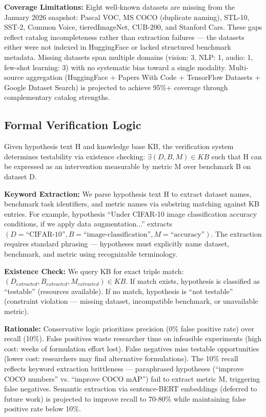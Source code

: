 \textbf{Coverage Limitations:} Eight well-known datasets are missing from the January 2026 snapshot: Pascal VOC, MS COCO (duplicate naming), STL-10, SST-2, Common Voice, tieredImageNet, CUB-200, and Stanford Cars. These gaps reflect catalog incompleteness rather than extraction failures --- the datasets either were not indexed in HuggingFace or lacked structured benchmark metadata. Missing datasets span multiple domains (vision: 3, NLP: 1, audio: 1, few-shot learning: 3) with no systematic bias toward a single modality. Multi-source aggregation (HuggingFace + Papers With Code + TensorFlow Datasets + Google Dataset Search) is projected to achieve 95\%+ coverage through complementary catalog strengths.

\subsection{Formal Verification Logic}

Given hypothesis text H and knowledge base KB, the verification system determines testability via existence checking: $\exists (D,B,M) \in KB$ such that H can be expressed as an intervention measurable by metric M over benchmark B on dataset D.

\textbf{Keyword Extraction:} We parse hypothesis text H to extract dataset names, benchmark task identifiers, and metric names via substring matching against KB entries. For example, hypothesis ``Under CIFAR-10 image classification accuracy conditions, if we apply data augmentation...'' extracts $(D=\text{``CIFAR-10''}, B=\text{``image-classification''}, M=\text{``accuracy''})$. The extraction requires standard phrasing --- hypotheses must explicitly name dataset, benchmark, and metric using recognizable terminology.

\textbf{Existence Check:} We query KB for exact triple match: $(D_{extracted}, B_{extracted}, M_{extracted}) \in KB$. If match exists, hypothesis is classified as ``testable'' (resources available). If no match, hypothesis is ``not testable'' (constraint violation --- missing dataset, incompatible benchmark, or unavailable metric).

\textbf{Rationale:} Conservative logic prioritizes precision (0\% false positive rate) over recall (10\%). False positives waste researcher time on infeasible experiments (high cost: weeks of formulation effort lost). False negatives miss testable opportunities (lower cost: researchers may find alternative formulations). The 10\% recall reflects keyword extraction brittleness --- paraphrased hypotheses (``improve COCO numbers'' vs. ``improve COCO mAP'') fail to extract metric M, triggering false negatives. Semantic extraction via sentence-BERT embeddings (deferred to future work) is projected to improve recall to 70-80\% while maintaining false positive rate below 10\%.

